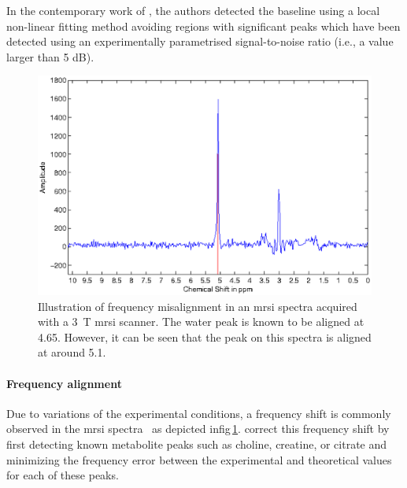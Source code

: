 In the contemporary work of \citeauthor{Tiwari2012}, the authors detected the baseline using a local non-linear fitting method avoiding regions with significant peaks which have been detected using an experimentally parametrised signal-to-noise ratio (i.e., a value larger than 5 dB).

\begin{figure}
\centering
\includegraphics[width=0.7\linewidth]{3_review/figures/processing/pre-processing/frequency/frequency.eps}
\caption[Illustration of frequency misalignment in an \acs*{mrsi} spectra.]{Illustration of frequency misalignment in an \acs*{mrsi} spectra acquired with a \SI{3}{\tesla} \acs*{mrsi} scanner. The water peak is known to be aligned at \SI{4.65}{\ppm}. However, it can be seen that the peak on this spectra is aligned at around \SI{5.1}{\ppm}.}
\label{fig:frequency}
\end{figure}

\paragraph{Frequency alignment}
Due to variations of the experimental conditions, a frequency shift is commonly observed in the \ac{mrsi} spectra~\cite{Chen2002,Osorio-Garcia2012} as depicted in\acs{fig}\,\ref{fig:frequency}.
\citeauthor{Tiwari2012} correct this frequency shift by first detecting known metabolite peaks such as choline, creatine, or citrate and minimizing the frequency error between the experimental and theoretical values for each of these peaks\cite{Tiwari2012}.

